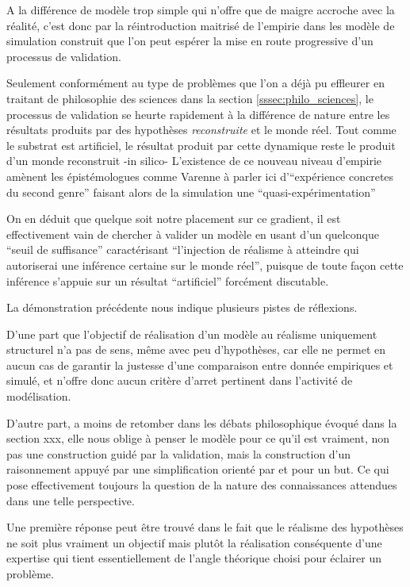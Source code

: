 A la différence de modèle trop simple qui n'offre que de maigre accroche avec la réalité, c'est donc par la réintroduction maitrisé de l'empirie dans les modèle de simulation construit que l'on peut espérer la mise en route progressive d'un processus de validation.

Seulement conformément au type de problèmes que l'on a déjà pu effleurer en traitant de philosophie des sciences dans la section \ref{sssec:philo_sciences}, le processus de validation se heurte rapidement à la différence de nature entre les résultats produits par des hypothèses \textit{reconstruite} et le monde réel. Tout comme le substrat est artificiel, le résultat produit par cette dynamique reste le produit d'un monde reconstruit -in silico- L'existence de ce nouveau niveau d'empirie amènent les épistémologues comme Varenne à parler ici d'\enquote{expérience concretes du second genre} faisant alors de la simulation une \enquote{quasi-expérimentation} \autocites{Varenne2001, Varenne2007, Phan2008}

On en déduit que quelque soit notre placement sur ce gradient, il est effectivement vain de chercher à valider un modèle en usant d'un quelconque \enquote{seuil de suffisance} caractérisant \enquote{l'injection de réalisme à atteindre qui autoriserai une inférence certaine sur le monde réel}, puisque de toute façon cette inférence s'appuie sur un résultat \enquote{artificiel} forcément discutable.   

La démonstration précédente nous indique plusieurs pistes de réflexions.

D'une part que l'objectif de réalisation d'un modèle au réalisme uniquement structurel n'a pas de sens, même avec peu d'hypothèses, car elle ne permet en aucun cas de garantir la justesse d'une comparaison entre donnée empiriques et simulé, et n'offre donc aucun critère d'arret pertinent dans l'activité de modélisation.

D'autre part, a moins de retomber dans les débats philosophique évoqué dans la section xxx, elle nous oblige à penser le modèle pour ce qu'il est vraiment, non pas une construction guidé par la validation, mais la construction d'un raisonnement appuyé par une simplification orienté par et pour un but. Ce qui pose effectivement toujours la question de la nature des connaissances attendues dans une telle perspective.

Une première réponse peut être trouvé dans le fait que le réalisme des hypothèses ne soit plus vraiment un objectif mais plutôt la réalisation conséquente d'une expertise qui tient essentiellement de l'angle théorique choisi pour éclairer un problème.

